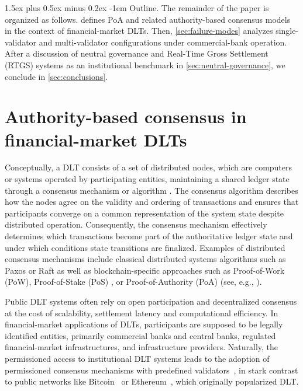 \documentclass[
reprint,
showkeys,
superscriptaddress,
aps,
pra,
longbibliography,
nofootinbib,
]{revtex4-2}
\makeatletter
\theoremstyle{definition}\newtheorem{definition}{Definition}
\renewcommand\paragraph{%
	\@startsection{paragraph}{4}{\z@}%
	{1.5ex plus 0.5ex minus 0.2ex}%
	{-1em}%
	{\normalfont\normalsize\bfseries}%
}
\makeatother
\begin{document}
\paragraph{Outline.}
The remainder of the paper is organized as follows.
 defines PoA and related authority-based consensus models in the context of financial-market DLTs.
Then, \cref{sec:failure-modes} analyzes single-validator and multi-validator configurations under commercial-bank operation.
After a discussion of neutral governance and Real-Time Gross Settlement (RTGS) systems as an institutional benchmark in \cref{sec:neutral-governance}, we conclude in \cref{sec:conclusions}.


\section{Authority-based consensus in financial-market DLTs}
\label{sec:authority-based-consensus}

Conceptually, a DLT consists of a set of distributed nodes, which are computers or systems operated by participating entities, maintaining a shared ledger state through a consensus mechanism or algorithm \cite{schneider1990implementing,nakamoto2008,cpmiDlt2017}. 
The consensus algorithm describes how the nodes agree on the validity and ordering of transactions and ensures that participants converge on a common representation of the system state despite distributed operation.
Consequently, the consensus mechanism effectively determines which transactions become part of the authoritative ledger state and under which conditions state transitions are finalized.
Examples of distributed consensus mechanisms include classical distributed systems algorithms such as Paxos \cite{lamport1998paxos} or Raft \cite{ongaro2014raft} as well as blockchain-specific approaches such as Proof-of-Work (PoW)\cite{nakamoto2008}, Proof-of-Stake (PoS) \cite{buterincasper2018PoS}, or Proof-of-Authority (PoA) (see, e.g., \cite{MANOLACHE2022580,szilagyi2017clique,woodPoA}). 


Public DLT systems often rely on open participation and decentralized consensus at the cost of scalability, settlement latency and computational efficiency.
In financial-market applications of DLTs, participants are supposed to be legally identified entities, primarily commercial banks and central banks, regulated financial-market infrastructures, and infrastructure providers.
Naturally, the permissioned access to institutional DLT systems leads to the adoption of permissioned consensus mechanisms with predefined validators~\cite{auerMonnetShin2021}, in stark contrast to public networks like Bitcoin~\cite{nakamoto2008} or Ethereum~\cite{buterin2014ethereum}, which originally popularized DLT.
\end{document}
